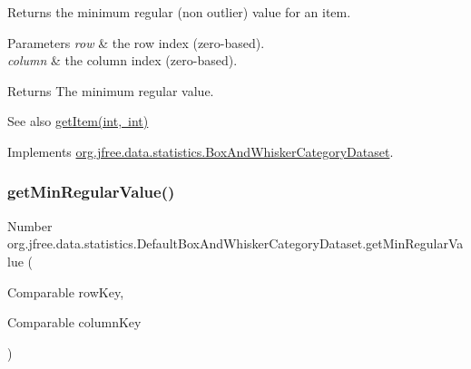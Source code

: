 Returns the minimum regular (non outlier) value for an item.


\begin{DoxyParams}{Parameters}
{\em row} & the row index (zero-\/based). \\
\hline
{\em column} & the column index (zero-\/based).\\
\hline
\end{DoxyParams}
\begin{DoxyReturn}{Returns}
The minimum regular value.
\end{DoxyReturn}
\begin{DoxySeeAlso}{See also}
\mbox{\hyperlink{classorg_1_1jfree_1_1data_1_1statistics_1_1_default_box_and_whisker_category_dataset_a85c944b06e4337059ea728b3a744e2a9}{get\+Item(int, int)}} 
\end{DoxySeeAlso}


Implements \mbox{\hyperlink{interfaceorg_1_1jfree_1_1data_1_1statistics_1_1_box_and_whisker_category_dataset_a1f8c01c076b3119bc284d9018f673fda}{org.\+jfree.\+data.\+statistics.\+Box\+And\+Whisker\+Category\+Dataset}}.

\mbox{\label{classorg_1_1jfree_1_1data_1_1statistics_1_1_default_box_and_whisker_category_dataset_a8280fd48bbb2161d62cf90473f46eac8}} 
\subsubsection{\texorpdfstring{get\+Min\+Regular\+Value()}{getMinRegularValue()}\hspace{0.1cm}{\footnotesize\ttfamily [2/2]}}
{\footnotesize\ttfamily Number org.\+jfree.\+data.\+statistics.\+Default\+Box\+And\+Whisker\+Category\+Dataset.\+get\+Min\+Regular\+Value (\begin{DoxyParamCaption}\item[{Comparable}]{row\+Key,  }\item[{Comparable}]{column\+Key }\end{DoxyParamCaption})}

